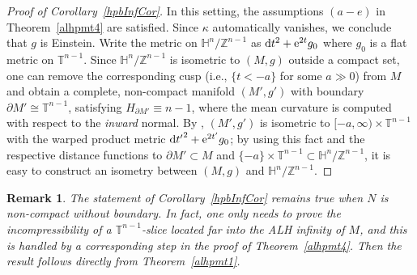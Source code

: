 \documentclass[10pt,a4paper]{amsart}
\numberwithin{equation}{section}
\newtheorem{Remark}[Theorem]{Remark} }
\def\H{\mathbb{H}}
\def\T{\mathbb{T}}
\def\Z{\mathbb{Z}}
\def\ed{{\rm d}}
\begin{document}
\begin{proof}[Proof of Corollary~\ref{hpbInfCor}] In this setting, the assumptions $(a-e)$
in Theorem~\ref{alhpmt4} are satisfied. Since $\kappa$ automatically vanishes, we conclude that $g$ is Einstein.
Write the metric on $\H^n/\Z^{n-1}$ as $\ed t^2 + {\rm e}^{2t} g_0$ where $g_0$ is a flat metric on $\T^{n-1}$. Since $\H^n/\Z^{n-1}$ is isometric
to $(M,g)$ outside a compact set, one can remove the corresponding cusp (i.e., $\{t<-a\}$ for some $a\gg 0$) from $M$ and obtain a
complete, non-compact manifold $(M', g')$ with boundary $\partial M'\cong \T^{n-1}$, satisfying $H_{\partial M'} \equiv  n - 1$, where the mean
curvature is computed with respect to the \emph{inward} normal.
By \cite[Theorem 2]{CK92}, $(M', g')$ is isometric to $[-a,\infty)\times \T^{n-1}$ with the warped product metric
$\ed {t'}^2 + {\rm e}^{2t'} g_0$;
by using this fact and the respective distance functions to $\partial M'\subset M$ and $\{-a\}\times\T^{n-1}\subset \H^n/\Z^{n-1}$, it is easy to construct an isometry
between $(M,g)$ and $\H^n/\Z^{n-1}$.
\end{proof}

\begin{Remark}\label{hpbInfCor_NonCptRmk}
The statement of Corollary~\ref{hpbInfCor} remains true when $N$ is
non-compact without boundary. In fact, one only needs to prove the incompressibility of
a $\T^{n-1}$-slice located far into the ALH infinity of $M$, and this is handled by a corresponding step
in the proof of Theorem~\ref{alhpmt4}. Then the result follows directly from Theorem~\ref{alhpmt1}.
\end{Remark}
\end{document}
